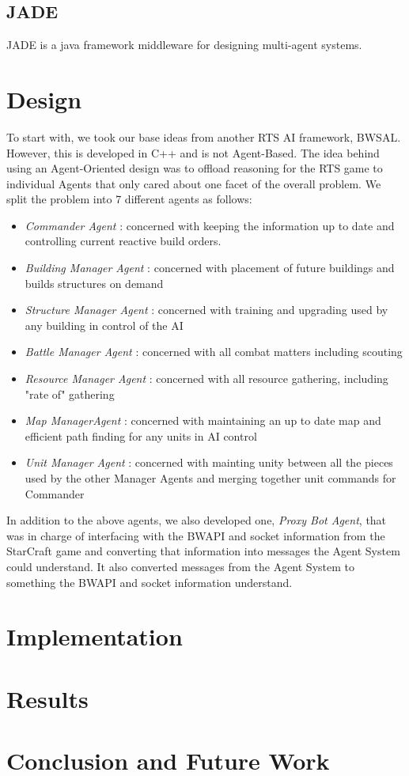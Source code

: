 \documentclass[letterpaper]{article}
\begin{document}
\subsection{JADE}
JADE is a java framework middleware for designing multi-agent systems.

\section{Design}
To start with, we took our base ideas from another RTS AI framework, BWSAL.  However, this is developed in C++ and is not Agent-Based. The idea behind using an Agent-Oriented design was to offload reasoning for the RTS game to individual Agents that only cared about one facet of the overall problem.  We split the problem into 7 different agents as follows:
\begin{itemize}
\item \emph{Commander Agent} : concerned with keeping the information up to date and controlling current reactive build orders.
\item \emph{Building Manager Agent} :  concerned with placement of future buildings and builds structures on demand
\item \emph{Structure Manager Agent} : concerned with training and upgrading used by any building in control of the AI
\item \emph{Battle Manager Agent} : concerned with all combat matters including scouting
\item \emph{Resource Manager Agent} : concerned with all resource gathering, including "rate of" gathering
\item \emph{Map ManagerAgent} : concerned with maintaining an up to date map and efficient path finding for any units in AI control
\item \emph{Unit Manager Agent} : concerned with mainting unity between all the pieces used by the other Manager Agents and merging together unit commands for Commander
\end{itemize}

In addition to the above agents, we also developed one, \emph{Proxy Bot Agent}, that was in charge of interfacing with the BWAPI and socket information from the StarCraft game and converting that information into messages the Agent System could understand.  It also converted messages from the Agent System to something the BWAPI and socket information understand.


\section{Implementation}

\section{Results}



\section{Conclusion and Future Work}
\end{document}
